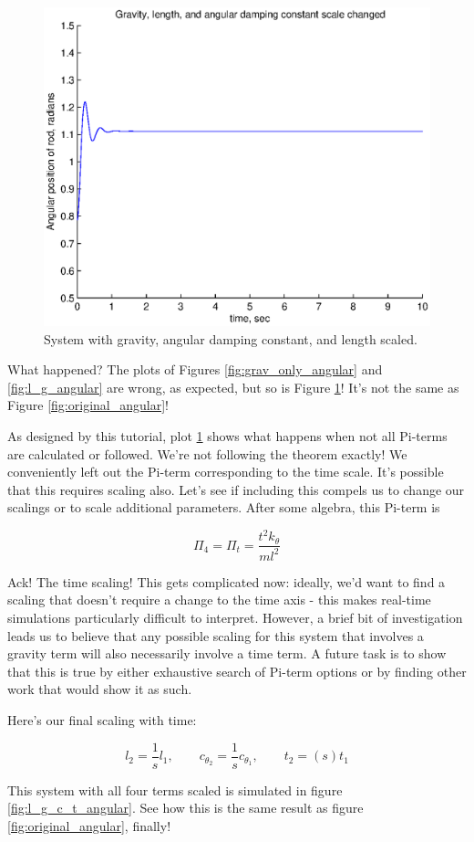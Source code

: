 \documentclass[12pt,letterpaper]{article}
\begin{document}
\begin{figure}[ht]
  \centering
  \includegraphics[width=.48\linewidth]{img/l_g_c_angular.eps}
  \caption{System with gravity, angular damping constant, and length scaled. }
  \label{fig:l_g_c_angular}
\end{figure}


What happened? The plots of Figures \ref{fig:grav_only_angular} and \ref{fig:l_g_angular} are wrong, as expected, but so is Figure \ref{fig:l_g_c_angular}!
It's not the same as Figure \ref{fig:original_angular}! 


As designed by this tutorial, plot \ref{fig:l_g_c_angular} shows what happens when not all Pi-terms are calculated or followed.
We're not following the theorem exactly! 
We conveniently left out the Pi-term corresponding to the time scale.
It's possible that this requires scaling also. 
Let's see if including this compels us to change our scalings or to scale additional parameters.
After some algebra, this Pi-term is

\[
\Pi_4 = \Pi_{t} = \frac{t^2 k_{\theta}}{m l^2}
\]

Ack! The time scaling! 
This gets complicated now: ideally, we'd want to find a scaling that doesn't require a change to the time axis - this makes real-time simulations particularly difficult to interpret.
However, a brief bit of investigation leads us to believe that any possible scaling for this system that involves a gravity term will also necessarily involve a time term.
A future task is to show that this is true by either exhaustive search of Pi-term options or by finding other work that would show it as such. 

Here's our final scaling with time:

\[
l_2 = \frac{1}{s} l_1 , \quad \quad c_{\theta_2} = \frac{1}{s} c_{\theta_1}, \quad \quad t_2 = (s) t_1
\]

This system with all four terms scaled is simulated in figure \ref{fig:l_g_c_t_angular}. See how this is the same result as figure \ref{fig:original_angular}, finally!
\end{document}
